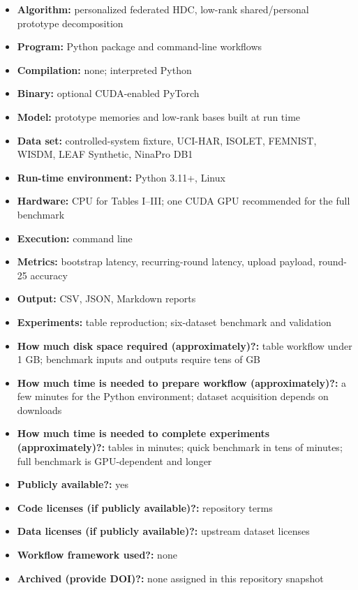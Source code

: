 \documentclass[11pt]{article}
\begin{document}
{\small
\begin{itemize}
  \item {\bf Algorithm: } personalized federated HDC, low-rank shared/personal prototype decomposition
  \item {\bf Program: } Python package and command-line workflows
  \item {\bf Compilation: } none; interpreted Python
  \item {\bf Binary: } optional CUDA-enabled PyTorch
  \item {\bf Model: } prototype memories and low-rank bases built at run time
  \item {\bf Data set: } controlled-system fixture, UCI-HAR, ISOLET, FEMNIST, WISDM, LEAF Synthetic, NinaPro DB1
  \item {\bf Run-time environment: } Python 3.11+, Linux
  \item {\bf Hardware: } CPU for Tables I--III; one CUDA GPU recommended for the full benchmark
  \item {\bf Execution: } command line
  \item {\bf Metrics: } bootstrap latency, recurring-round latency, upload payload, round-25 accuracy
  \item {\bf Output: } CSV, JSON, Markdown reports
  \item {\bf Experiments: } table reproduction; six-dataset benchmark and validation
  \item {\bf How much disk space required (approximately)?: } table workflow under 1 GB; benchmark inputs and outputs require tens of GB
  \item {\bf How much time is needed to prepare workflow (approximately)?: } a few minutes for the Python environment; dataset acquisition depends on downloads
  \item {\bf How much time is needed to complete experiments (approximately)?: } tables in minutes; quick benchmark in tens of minutes; full benchmark is GPU-dependent and longer
  \item {\bf Publicly available?: } yes
  \item {\bf Code licenses (if publicly available)?: } repository terms
  \item {\bf Data licenses (if publicly available)?: } upstream dataset licenses
  \item {\bf Workflow framework used?: } none
  \item {\bf Archived (provide DOI)?: } none assigned in this repository snapshot
\end{itemize}
}
\end{document}

